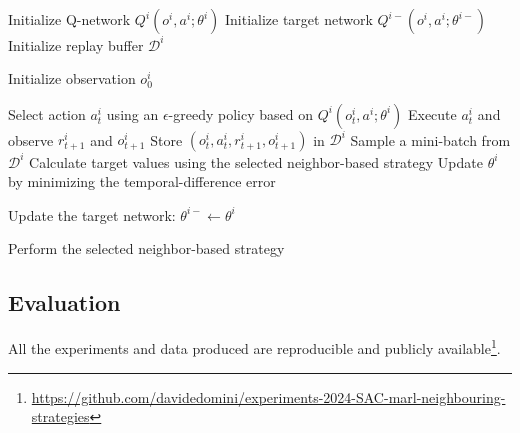 \begin{algorithm}
    \caption{Neighbor-Based Deep Q-Learning}
    \label{alg:neighbor_dqn}

    \begin{algorithmic}[1]
            \State Initialize Q-network
                $Q^i(o^i, a^i; \theta^i)$
            \State Initialize target network
                $Q^{i-}(o^i, a^i; \theta^{i-})$
            \State Initialize replay buffer $\mathcal{D}^i$
        \EndFor

                \State Initialize observation $o_0^i$
            \EndFor

                    \State Select action $a_t^i$ using an
                        $\epsilon$-greedy policy based on
                        $Q^i(o_t^i, a^i; \theta^i)$
                    \State Execute $a_t^i$ and observe
                        $r_{t+1}^i$ and $o_{t+1}^i$
                    \State Store
                        $(o_t^i, a_t^i, r_{t+1}^i, o_{t+1}^i)$
                        in $\mathcal{D}^i$
                    \State Sample a mini-batch from $\mathcal{D}^i$
                    \State Calculate target values using the selected
                        neighbor-based strategy
                    \State Update $\theta^i$ by minimizing the
                        temporal-difference error

                        \State Update the target network:
                            $\theta^{i-} \gets \theta^i$
                    \EndIf

                        \State Perform the selected neighbor-based strategy
                    \EndIf
                \EndFor
            \EndFor
        \EndFor
    \end{algorithmic}
\end{algorithm}

\subsection{Evaluation}
All the experiments and data produced are reproducible 
 and publicly available\footnote{\url{https://github.com/davidedomini/experiments-2024-SAC-marl-neighbouring-strategies}}.

